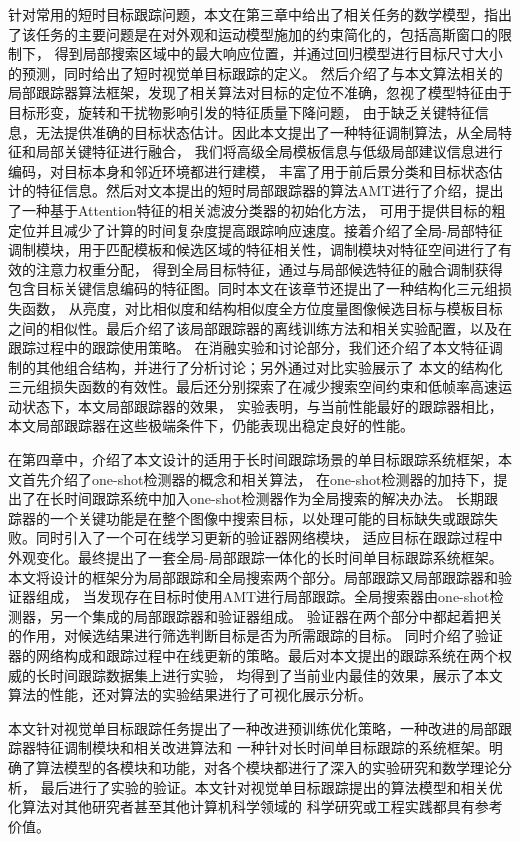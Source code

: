 \documentclass[promaster]{thesis-uestc}
\begin{document}
针对常用的短时目标跟踪问题，本文在第三章中给出了相关任务的数学模型，指出了该任务的主要问题是在对外观和运动模型施加的约束简化的，包括高斯窗口的限制下，
得到局部搜索区域中的最大响应位置，并通过回归模型进行目标尺寸大小的预测，同时给出了短时视觉单目标跟踪的定义。
然后介绍了与本文算法相关的局部跟踪器算法框架，发现了相关算法对目标的定位不准确，忽视了模型特征由于目标形变，旋转和干扰物影响引发的特征质量下降问题，
由于缺乏关键特征信息，无法提供准确的目标状态估计。因此本文提出了一种特征调制算法，从全局特征和局部关键特征进行融合，
我们将高级全局模板信息与低级局部建议信息进行编码，对目标本身和邻近环境都进行建模，
丰富了用于前后景分类和目标状态估计的特征信息。然后对文本提出的短时局部跟踪器的算法AMT进行了介绍，提出了一种基于Attention特征的相关滤波分类器的初始化方法，
可用于提供目标的粗定位并且减少了计算的时间复杂度提高跟踪响应速度。接着介绍了全局-局部特征调制模块，用于匹配模板和候选区域的特征相关性，调制模块对特征空间进行了有效的注意力权重分配，
得到全局目标特征，通过与局部候选特征的融合调制获得包含目标关键信息编码的特征图。同时本文在该章节还提出了一种结构化三元组损失函数，
从亮度，对比相似度和结构相似度全方位度量图像候选目标与模板目标之间的相似性。最后介绍了该局部跟踪器的离线训练方法和相关实验配置，以及在跟踪过程中的跟踪使用策略。
在消融实验和讨论部分，我们还介绍了本文特征调制的其他组合结构，并进行了分析讨论；另外通过对比实验展示了
本文的结构化三元组损失函数的有效性。最后还分别探索了在减少搜索空间约束和低帧率高速运动状态下，本文局部跟踪器的效果，
实验表明，与当前性能最好的跟踪器相比，本文局部跟踪器在这些极端条件下，仍能表现出稳定良好的性能。

在第四章中，介绍了本文设计的适用于长时间跟踪场景的单目标跟踪系统框架，本文首先介绍了one-shot检测器的概念和相关算法，
在one-shot检测器的加持下，提出了在长时间跟踪系统中加入one-shot检测器作为全局搜索的解决办法。
长期跟踪器的一个关键功能是在整个图像中搜索目标，以处理可能的目标缺失或跟踪失败。同时引入了一个可在线学习更新的验证器网络模块，
适应目标在跟踪过程中外观变化。最终提出了一套全局-局部跟踪一体化的长时间单目标跟踪系统框架。
本文将设计的框架分为局部跟踪和全局搜索两个部分。局部跟踪又局部跟踪器和验证器组成，
当发现存在目标时使用AMT进行局部跟踪。全局搜索器由one-shot检测器，另一个集成的局部跟踪器和验证器组成。
验证器在两个部分中都起着把关的作用，对候选结果进行筛选判断目标是否为所需跟踪的目标。
同时介绍了验证器的网络构成和跟踪过程中在线更新的策略。最后对本文提出的跟踪系统在两个权威的长时间跟踪数据集上进行实验，
均得到了当前业内最佳的效果，展示了本文算法的性能，还对算法的实验结果进行了可视化展示分析。

本文针对视觉单目标跟踪任务提出了一种改进预训练优化策略，一种改进的局部跟踪器特征调制模块和相关改进算法和
一种针对长时间单目标跟踪的系统框架。明确了算法模型的各模块和功能，对各个模块都进行了深入的实验研究和数学理论分析，
最后进行了实验的验证。本文针对视觉单目标跟踪提出的算法模型和相关优化算法对其他研究者甚至其他计算机科学领域的
科学研究或工程实践都具有参考价值。
\end{document}
